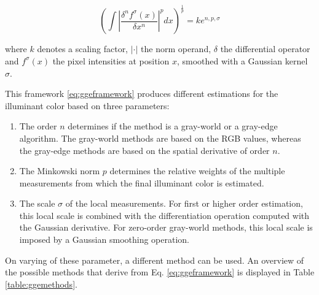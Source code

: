 \begin{equation}\label{eq:ggeframework}
\left( \int 	\left | \frac{\delta^n f^{\sigma}(x)}{\delta x^{n}} \right |^{p} dx \right)^{\frac{1}{p}} = k e ^{n, p, \sigma}
\end{equation}

where $k$ denotes a scaling factor, $|\cdot|$ the norm operand, $\delta$ the differential operator and $f^{\sigma}(x)$ the pixel intensities at position $x$, smoothed with a Gaussian kernel $\sigma$.

This framework \ref{eq:ggeframework} produces different estimations for the illuminant color based on three parameters:

\begin{enumerate}
\item The order $n$ determines if the method is a gray-world or a gray-edge algorithm. The gray-world methods are based on the RGB values, whereas the gray-edge methods are based on the spatial derivative of order $n$.
\item The Minkowski norm $p$ determines the relative weights of the multiple measurements from which the final illuminant color is estimated.
\item The scale $\sigma$ of the local measurements. For first or higher order estimation, this local scale is combined with the differentiation operation computed with the Gaussian derivative. For zero-order gray-world methods, this local scale is imposed by a Gaussian smoothing operation.
\end{enumerate}

On varying of these parameter, a different method can be used. An overview of the possible methods that derive from  Eq. \ref{eq:ggeframework} is displayed in Table \ref{table:ggemethods}.

